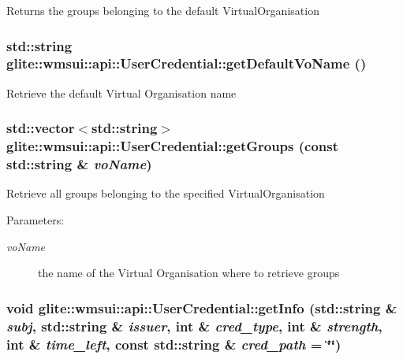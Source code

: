 Returns the groups belonging to the default Virtual\-Organisation \hypertarget{classglite_1_1wmsui_1_1api_1_1UserCredential_a9}{
\subsubsection[getDefaultVoName]{\setlength{\rightskip}{0pt plus 5cm}std::string glite::wmsui::api::User\-Credential::get\-Default\-Vo\-Name ()}}
\label{classglite_1_1wmsui_1_1api_1_1UserCredential_a9}


Retrieve the default Virtual Organisation name \hypertarget{classglite_1_1wmsui_1_1api_1_1UserCredential_a11}{
\subsubsection[getGroups]{\setlength{\rightskip}{0pt plus 5cm}std::vector$<$std::string$>$ glite::wmsui::api::User\-Credential::get\-Groups (const std::string \& {\em vo\-Name})}}
\label{classglite_1_1wmsui_1_1api_1_1UserCredential_a11}


Retrieve all groups belonging to the specified Virtual\-Organisation \begin{Desc}
\item[Parameters:]
\begin{description}
\item[{\em vo\-Name}]the name of the Virtual Organisation where to retrieve groups \end{description}
\end{Desc}
\hypertarget{classglite_1_1wmsui_1_1api_1_1UserCredential_a7}{
\subsubsection[getInfo]{\setlength{\rightskip}{0pt plus 5cm}void glite::wmsui::api::User\-Credential::get\-Info (std::string \& {\em subj}, std::string \& {\em issuer}, int \& {\em cred\_\-type}, int \& {\em strength}, int \& {\em time\_\-left}, const std::string \& {\em cred\_\-path} = \char`\"{}\char`\"{})}}
\label{classglite_1_1wmsui_1_1api_1_1UserCredential_a7}


